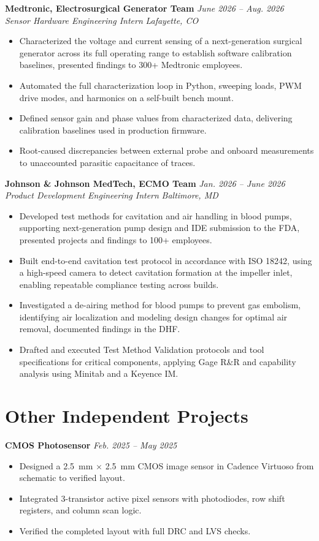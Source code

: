 \documentclass[10.5pt,letterpaper]{article}
\newcommand{\tightlist}{\vspace{-9pt}}
\newcommand{\jobhead}[4]{%
  \noindent\textbf{#1} \hfill \textit{#2}\\
  \noindent\textit{#3} \hfill \textit{#4}\\[-0.15em]
}
\newcommand{\projhead}[2]{%
  \noindent\textbf{#1} \hfill \textit{#2}\\[-0.15em]
}
\begin{document}
\jobhead{Medtronic, Electrosurgical Generator Team}{June 2026 -- Aug. 2026}{Sensor Hardware Engineering Intern}{Lafayette, CO}
\tightlist
\begin{itemize}
  \item Characterized the voltage and current sensing of a next-generation surgical generator across its full operating range to establish software calibration baselines, presented findings to 300+ Medtronic employees.
  \item Automated the full characterization loop in Python, sweeping loads, PWM drive modes, and harmonics on a self-built bench mount.
  \item Defined sensor gain and phase values from characterized data, delivering calibration baselines used in production firmware.
  \item Root-caused discrepancies between external probe and onboard measurements to unaccounted parasitic capacitance of traces.
\end{itemize}

\jobhead{Johnson \& Johnson MedTech, ECMO Team}{Jan. 2026 -- June 2026}{Product Development Engineering Intern}{Baltimore, MD}
\tightlist
\begin{itemize}
  \item Developed test methods for cavitation and air handling in blood pumps, supporting next-generation pump design and IDE submission to the FDA, presented projects and findings to 100+ employees.
  \item Built end-to-end cavitation test protocol in accordance with ISO 18242, using a high-speed camera to detect cavitation formation at the impeller inlet, enabling repeatable compliance testing across builds.
  \item Investigated a de-airing method for blood pumps to prevent gas embolism, identifying air localization and modeling design changes for optimal air removal, documented findings in the DHF.
  \item Drafted and executed Test Method Validation protocols and tool specifications for critical components, applying Gage R\&R and capability analysis using Minitab and a Keyence IM.
\end{itemize}

\section{Other Independent Projects}

\projhead{CMOS Photosensor}{Feb. 2025 -- May 2025}
\tightlist
\begin{itemize}
  \item Designed a 2.5~mm $\times$ 2.5~mm CMOS image sensor in Cadence Virtuoso from schematic to verified layout.
  \item Integrated 3-transistor active pixel sensors with photodiodes, row shift registers, and column scan logic.
  \item Verified the completed layout with full DRC and LVS checks.
\end{itemize}
\end{document}
